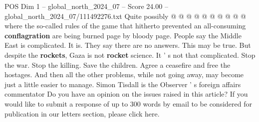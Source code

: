 \begin{textsample}{POS Dim 1 – global\_north\_2024\_07 – Score 24.00 – global\_north\_2024\_07/111492276.txt}
Quite possibly @ @ @ @ @ @ @ @ @ @ where the so-called rules of the game that hitherto prevented an all-consuming \textbf{conflagration} are being burned page by bloody page.
People say the Middle East is complicated.
It is.
They say there are no answers.
This may be true.
But despite the \textbf{rockets}, Gaza is not \textbf{rocket} science.
It ' s not that complicated.
Stop the war.
Stop the killing.
Save the children.
Agree a ceasefire and free the hostages.
And then all the other problems, while not going away, may become just a little easier to manage.
Simon Tisdall is the Observer ' s foreign affairs commentator Do you have an opinion on the issues raised in this article?
If you would like to submit a response of up to 300 words by email to be considered for publication in our letters section, please click here.

\end{textsample}
